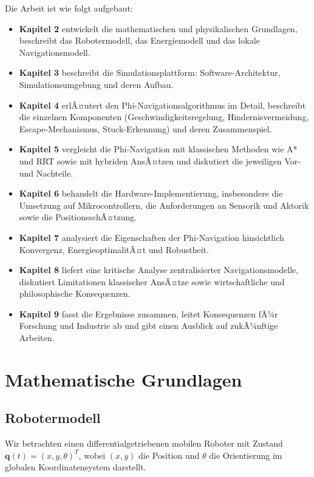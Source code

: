﻿\documentclass[a4paper,12pt]{article}
\theoremstyle{definition}
\begin{document}
Die Arbeit ist wie folgt aufgebaut:
\begin{itemize}
	\item \textbf{Kapitel 2} entwickelt die mathematischen und physikalischen Grundlagen, beschreibt das Robotermodell, das Energiemodell und das lokale Navigationsmodell.
	\item \textbf{Kapitel 3} beschreibt die Simulationsplattform: Software-Architektur, Simulationsumgebung und deren Aufbau.
	\item \textbf{Kapitel 4} erlÃ¤utert den Phi-Navigationsalgorithmus im Detail, beschreibt die einzelnen Komponenten (Geschwindigkeitsregelung, Hindernisvermeidung, Escape-Mechanismus, Stuck-Erkennung) und deren Zusammenspiel.
	\item \textbf{Kapitel 5} vergleicht die Phi-Navigation mit klassischen Methoden wie A* und RRT sowie mit hybriden AnsÃ¤tzen und diskutiert die jeweiligen Vor- und Nachteile.
	\item \textbf{Kapitel 6} behandelt die Hardware-Implementierung, insbesondere die Umsetzung auf Mikrocontrollern, die Anforderungen an Sensorik und Aktorik sowie die PositionsschÃ¤tzung.
	\item \textbf{Kapitel 7} analysiert die Eigenschaften der Phi-Navigation hinsichtlich Konvergenz, EnergieoptimalitÃ¤t und Robustheit.
	\item \textbf{Kapitel 8} liefert eine kritische Analyse zentralisierter Navigationsmodelle, diskutiert Limitationen klassischer AnsÃ¤tze sowie wirtschaftliche und philosophische Konsequenzen.
	\item \textbf{Kapitel 9} fasst die Ergebnisse zusammen, leitet Konsequenzen fÃ¼r Forschung und Industrie ab und gibt einen Ausblick auf zukÃ¼nftige Arbeiten.
\end{itemize}

\section{Mathematische Grundlagen}

\subsection{Robotermodell}

Wir betrachten einen differentialgetriebenen mobilen Roboter mit Zustand $\mathbf{q}(t) = (x, y, \theta)^T$, wobei $(x,y)$ die Position und $\theta$ die Orientierung im globalen Koordinatensystem darstellt.
\end{document}
